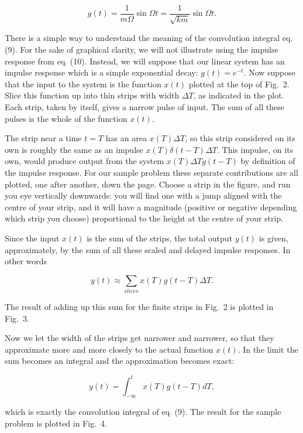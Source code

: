   \begin{equation*}g(t) = \dfrac{1}{m \Omega} \sin \Omega t= \dfrac{1}{\sqrt{k 
  m}} \sin \Omega t . \tag{10}\end{equation*} 

  There is a simple way to understand the meaning of the convolution integral 
  eq. (9). For the sake of graphical clarity, we will not illustrate using the 
  impulse response from eq. (10). Instead, we will suppose that our linear 
  system has an impulse response which is a simple exponential decay: 
  $g(t)=e^{-t}$. Now suppose that the input to the system is the function 
  $x(t)$ plotted at the top of Fig.\ 2. Slice this function up into thin strips 
  with width $\Delta T$, as indicated in the plot. Each strip, taken by itself, 
  gives a narrow pulse of input. The sum of all these pulses is the whole of 
  the function $x(t)$. 

  The strip near a time $t=T$ has an area $x(T) \Delta T$, so this strip 
  considered on its own is roughly the same as an impulse $x(T) \delta(t-T) 
  \Delta T$. This impulse, on its own, would produce output from the system 
  $x(T) \Delta T g(t-T)$ by definition of the impulse response. For our sample 
  problem these separate contributions are all plotted, one after another, down 
  the page. Choose a strip in the figure, and run you eye vertically downwards: 
  you will find one with a jump aligned with the centre of your strip, and it 
  will have a magnitude (positive or negative depending which strip you choose) 
  proportional to the height at the centre of your strip. 


  Since the input $x(t)$ is the sum of the strips, the total output $y(t)$ is 
  given, approximately, by the sum of all these scaled and delayed impulse 
  responses. In other words 

  \begin{equation*}y(t) \approx \sum_{slices}{x(T) g(t-T) \Delta T} . 
  \tag{11}\end{equation*} 

  The result of adding up this sum for the finite strips in Fig.\ 2 is plotted 
  in Fig.\ 3. 


  Now we let the width of the strips get narrower and narrower, so that they 
  approximate more and more closely to the actual function $x(t)$. In the limit 
  the sum becomes an integral and the approximation becomes exact: 

  \begin{equation*}y(t)=\int_{-\infty}^{t}{x(T) g(t-T) dT} , 
  \tag{12}\end{equation*} 

  \noindent{}which is exactly the convolution integral of eq. (9). The result 
  for the sample problem is plotted in Fig.\ 4. 

